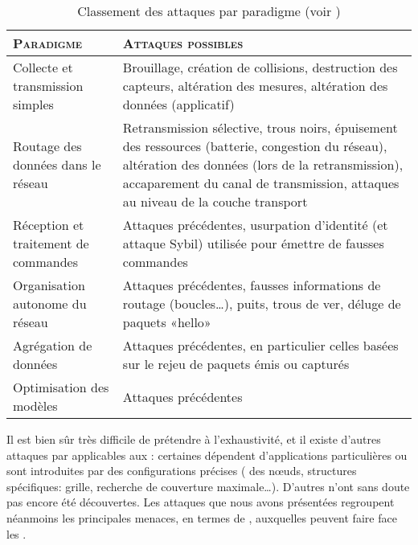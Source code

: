 \begin{table}[!ht]
    \caption[Classement des attaques par paradigme]{Classement des attaques par paradigme (voir )}\label{ea:tab:paradigm}
    \centering
    \medskip
    \begin{small}
        \begin{tabu}{X[1,l,m]|X[2,j,m]}
            \toprule
            \textsc{Paradigme} & \textsc{Attaques possibles}\\
            \midrule
            Collecte et transmission simples & Brouillage, création de collisions, destruction des capteurs, altération des mesures, altération des données (applicatif)\\
            \midrule
            Routage des données dans le réseau & Retransmission sélective, trous noirs, épuisement des ressources (batterie, congestion du réseau), altération des données (lors de la retransmission), accaparement du canal de transmission, attaques au niveau de la couche transport\\
            \midrule
            Réception et traitement de commandes & Attaques précédentes, usurpation d'identité (et attaque Sybil) utilisée pour émettre de fausses commandes\\
            \midrule
            Organisation autonome du réseau & Attaques précédentes, fausses informations de routage (boucles\dots), puits, trous de ver, déluge de paquets «hello»\\
            \midrule
            Agrégation de données & Attaques précédentes, en particulier celles basées sur le rejeu de paquets émis ou capturés\\
            \midrule
            Optimisation des modèles & Attaques précédentes\\
            \bottomrule
         \end{tabu}
     \end{small}
\end{table}

Il est bien sûr très difficile de prétendre à l'exhaustivité, et il existe d'autres attaques par \dds applicables aux \rcs: certaines dépendent d'applications particulières ou sont introduites par des configurations précises ( des nœuds, structures spécifiques: grille, recherche de couverture maximale\dots).
D'autres n'ont sans doute pas encore été découvertes.
Les attaques que nous avons présentées regroupent néanmoins les principales menaces, en termes de \dds, auxquelles peuvent faire face les \rcs.

